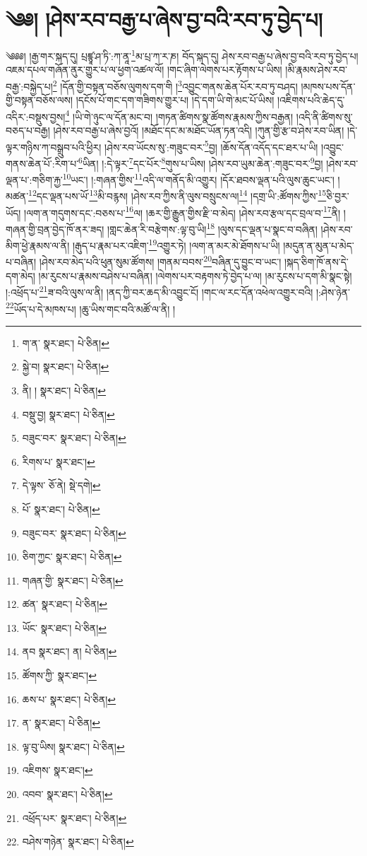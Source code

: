 \setcounter{footnote}{0} 
\chapter{༄༅། །ཤེས་རབ་བརྒྱ་པ་ཞེས་བྱ་བའི་རབ་ཏུ་བྱེད་པ།}༄༅༅། །རྒྱ་གར་སྐད་དུ། པྲཛྙཱ་ཤ་ཏི་:ཀ་ནཱ་\footnote{ག་ན་  སྣར་ཐང་།  པེ་ཅིན། }མ་པྲ་ཀ་ར་ཎ། བོད་སྐད་དུ། ཤེས་རབ་བརྒྱ་པ་ཞེས་བྱ་བའི་རབ་ཏུ་བྱེད་པ། འཇམ་དཔལ་གཞོན་ནུར་གྱུར་པ་ལ་ཕྱག་འཚལ་ལོ། །གང་ཞིག་ལེགས་པར་རྟོགས་པ་ཡིས། །མི་རྣམས་ཤེས་རབ་བརྒྱ་:བསྐྱེད་པ།\footnote{སྐྱེ་བ།  སྣར་ཐང་།  པེ་ཅིན། } །དོན་གྱི་བསྟན་བཅོས་ལུགས་དག་གི །\footnote{ནི། །  སྣར་ཐང་།  པེ་ཅིན། }འབྱུང་གནས་ཆེན་པོར་རབ་ཏུ་བཤད། །མཁས་པས་དོན་གྱི་བསྟན་བཅོས་ལས། །དངོས་པོ་གང་དག་གཟིགས་གྱུར་པ། །དེ་དག་ཡི་གེ་མང་པོ་ཡིས། །འཇིགས་པའི་ཆེད་དུ་འདིར་:བསྡུས་བྱས།\footnote{བསྡུ་བྱ།  སྣར་ཐང་།  པེ་ཅིན། } །ཡི་གེ་ཉུང་ལ་དོན་མང་བ། །གཏན་ཚིགས་སྣ་ཚོགས་རྣམས་ཀྱིས་བརྒྱན། །འདི་ནི་ཚིགས་སུ་བཅད་པ་བརྒྱ། །ཤེས་རབ་བརྒྱ་པ་ཞེས་བྱའོ། །མཐོང་དང་མ་མཐོང་ཡོན་ཏན་འདི། །ཀུན་གྱི་རྩ་བ་ཤེས་རབ་ཡིན། །དེ་ལྟར་གཉིས་ཀ་བསྒྲུབ་པའི་ཕྱིར། །ཤེས་རབ་ཡོངས་སུ་:གཟུང་བར་\footnote{བཟུང་བར་  སྣར་ཐང་།  པེ་ཅིན། }བྱ། །ཆོས་དོན་འདོད་དང་ཐར་པ་ཡི། །འབྱུང་གནས་ཆེན་པོ་:རིག་པ་\footnote{རིགས་པ་  སྣར་ཐང་། }ཡིན། །:དེ་ལྟར་\footnote{དེ་ལྟས་  ཅོ་ནེ།  སྡེ་དགེ། }དང་པོར་\footnote{པོ་  སྣར་ཐང་།  པེ་ཅིན། }གུས་པ་ཡིས། །ཤེས་རབ་ཡུམ་ཆེན་:གཟུང་བར་\footnote{བཟུང་བར་  སྣར་ཐང་།  པེ་ཅིན། }བྱ། །ཤེས་རབ་ལྡན་པ་:གཅིག་རྐྱ་\footnote{ཅིག་ཀྱང་  སྣར་ཐང་།  པེ་ཅིན། }ཡང་། །:གཞན་གྱིས་\footnote{གཞན་གྱི་  སྣར་ཐང་།  པེ་ཅིན། }འདི་ལ་གནོད་མི་འགྱུར། །དོར་ཐབས་ལྡན་པའི་ལུས་ཆུང་ཡང་། །མཚན་\footnote{ཚན་  སྣར་ཐང་།  པེ་ཅིན། }དང་ལྡན་པས་ཡོ་\footnote{ཡོང་  སྣར་ཐང་།  པེ་ཅིན། }མི་བརྙས། །ཤེས་རབ་ཀྱིས་ནི་ལུས་བསྲུངས་ལ།\footnote{ནབ  སྣར་ཐང་། ན།  པེ་ཅིན། } །དགྲ་ཡི་:ཚོགས་ཀྱིས་\footnote{ཚོགས་ཀྱི་  སྣར་ཐང་། }ཅི་བྱར་ཡོད། །ལག་ན་གདུགས་དང་:བཅས་པ་\footnote{ཆས་པ་  སྣར་ཐང་།  པེ་ཅིན། }ལ། །ཆར་གྱི་རྒྱུན་གྱིས་རྫི་བ་མེད། །ཤེས་རབ་རྩལ་དང་བྲལ་བ་\footnote{ན་  སྣར་ཐང་།  པེ་ཅིན། }ནི། །གཞན་གྱི་བྲན་བྱེད་ཁོ་ནར་ཟད། །གླང་ཆེན་རི་བརྩེགས་:ལྟ་བུ་ཡི།\footnote{ལྟ་བུ་ཡིས།  སྣར་ཐང་།  པེ་ཅིན། } །ལུས་དང་ལྡན་པ་སྣང་བ་བཞིན། །ཤེས་རབ་མིག་ཕྱེ་རྣམས་ལ་ནི། །རྒུད་པ་རྣམ་པར་འཇིག་\footnote{འཇིགས་  སྣར་ཐང་། }འགྱུར་ཏེ། །ལག་ན་མར་མེ་ཐོགས་པ་ཡི། །མདུན་ན་མུན་པ་མེད་པ་བཞིན། །ཤེས་རབ་མེད་པའི་ཕུན་སུམ་ཚོགས། །གནམ་བབས་\footnote{འབབ་  སྣར་ཐང་།  པེ་ཅིན། }བཞིན་དུ་བྱུང་བ་ཡང་། །སྐད་ཅིག་ཁོ་ནས་དེ་དག་མེད། །མ་རུངས་པ་རྣམས་བཤེས་པ་བཞིན། །ལེགས་པར་བརྟགས་ཏེ་བྱེད་པ་ལ། །མ་རུངས་པ་དག་མི་སྣང་སྟེ། །:འཕྲོད་པ་\footnote{འཕྲོད་པར་  སྣར་ཐང་།  པེ་ཅིན། }ཟ་བའི་ལུས་ལ་ནི། །ནད་ཀྱི་བར་ཆད་མི་འབྱུང་ངོ། །གང་ལ་རང་དོན་འཕེལ་འགྱུར་བའི། །:ཤེས་ཉེན་\footnote{བཤེས་གཉེན་  སྣར་ཐང་།  པེ་ཅིན། }ཡོད་པ་དེ་མཁས་པ། །ཆུ་ཡིས་གང་བའི་མཚོ་ལ་ནི། །
